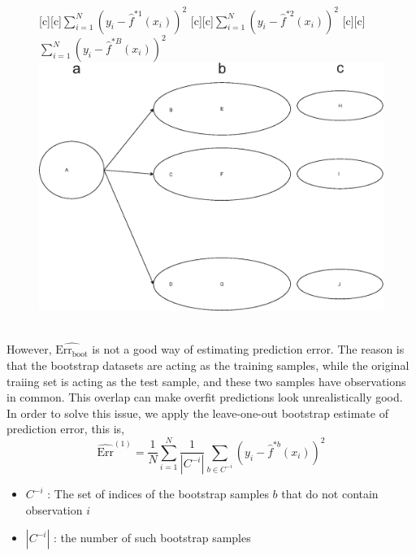 \documentclass[12pt,a4paper]{article}%
\theoremstyle{definition}
\theoremstyle{plain}
\numberwithin{equation}{section}
\begin{document}
\begin{framed}
\begin{figure}[H]
[c][c]{\footnotesize $\sum\limits_{i=1}^{N}(y_{i}-\hat{f}^{*1}(x_{i}))^{2}$}
[c][c]{\footnotesize $\sum\limits_{i=1}^{N}(y_{i}-\hat{f}^{*2}(x_{i}))^{2}$}
[c][c]{\footnotesize $\sum\limits_{i=1}^{N}(y_{i}-\hat{f}^{*B}(x_{i}))^{2}$}
\includegraphics[scale=0.8]{images//bootstrap.eps}
\\~\\
\caption{}\label{bootstrap}
\end{figure}
\end{framed}

However, $\widehat{\text{Err}_{\text{boot}}}$ is not a good way of estimating prediction error. 
The reason is that the bootstrap datasets are acting as the training samples, while the original traiing set is acting as the test sample, and these two samples have observations in common. 
This overlap can make overfit predictions look unrealistically good. \\

In order to solve this issue, we apply the leave-one-out bootstrap estimate of prediction error, this is, 
\begin{equation*}
\widehat{\text{Err}}^{(1)} = \frac{1}{N} \sum\limits_{i=1}^{N} \frac{1}{|C^{-i}|} \sum\limits_{b \in C^{-i}} (y_{i}-\hat{f}^{*b}(x_{i}))^{2} 
\end{equation*}

\begin{itemize}
\item $C^{-i}$ : The set of indices of the bootstrap samples $b$ that do not contain observation $i$ 
\item $|C^{-i}|$ : the number of such bootstrap samples
\end{itemize}
\end{document}
